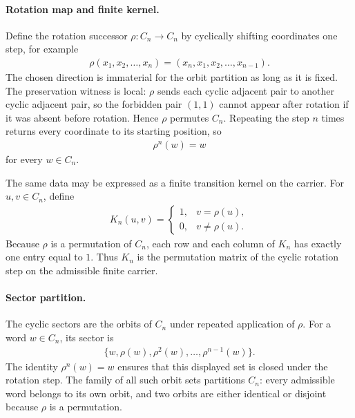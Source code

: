 \paragraph{Rotation map and finite kernel.}
Define the rotation successor $\rho:C_n\to C_n$ by cyclically shifting coordinates one step, for example
$$
\begin{aligned}
\rho(x_1,x_2,\ldots,x_n)=(x_n,x_1,x_2,\ldots,x_{n-1}).
\end{aligned}
$$
The chosen direction is immaterial for the orbit partition as long as it is fixed. The preservation witness is local: $\rho$ sends each cyclic adjacent pair to another cyclic adjacent pair, so the forbidden pair $(1,1)$ cannot appear after rotation if it was absent before rotation. Hence $\rho$ permutes $C_n$. Repeating the step $n$ times returns every coordinate to its starting position, so
$$
\begin{aligned}
\rho^n(w)=w
\end{aligned}
$$
for every $w\in C_n$.

The same data may be expressed as a finite transition kernel on the carrier. For $u,v\in C_n$, define
$$
\begin{aligned}
K_n(u,v)=
\begin{cases}
1, & v=\rho(u),\\
0, & v\ne\rho(u).
\end{cases}
\end{aligned}
$$
Because $\rho$ is a permutation of $C_n$, each row and each column of $K_n$ has exactly one entry equal to $1$. Thus $K_n$ is the permutation matrix of the cyclic rotation step on the admissible finite carrier.

\paragraph{Sector partition.}
The cyclic sectors are the orbits of $C_n$ under repeated application of $\rho$. For a word $w\in C_n$, its sector is
$$
\begin{aligned}
\{w,\rho(w),\rho^2(w),\ldots,\rho^{n-1}(w)\}.
\end{aligned}
$$
The identity $\rho^n(w)=w$ ensures that this displayed set is closed under the rotation step. The family of all such orbit sets partitions $C_n$: every admissible word belongs to its own orbit, and two orbits are either identical or disjoint because $\rho$ is a permutation.

